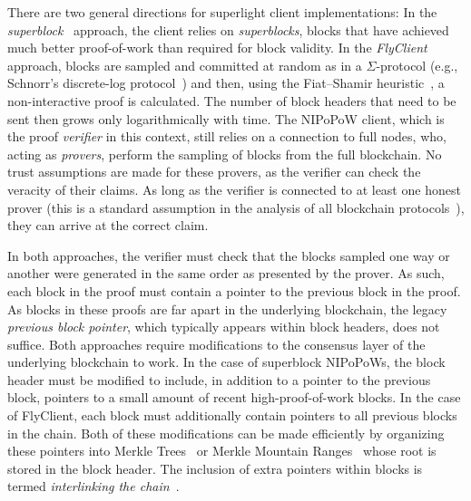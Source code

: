 There are two general directions for superlight client implementations: In the
\emph{superblock}~\cite{nipopows,compactsuperblocks} approach, the client
relies on \emph{superblocks}, blocks that have achieved much better
proof-of-work than required for block validity. In the
\emph{FlyClient}~\cite{flyclient} approach, blocks are sampled and committed at random as in a $\Sigma$-protocol (e.g., Schnorr's discrete-log protocol~\cite{schnorr}) and then, using
the Fiat--Shamir heuristic~\cite{fiatshamir}, a non-interactive proof is calculated. The number of block headers
that need to be sent then grows only logarithmically with time. The NIPoPoW
client, which is the proof \emph{verifier} in this context, still relies on a connection to full nodes,
who, acting as \emph{provers},  perform the sampling of blocks from the full
blockchain.
No trust assumptions are made for these provers, as the
verifier can check the veracity of their claims. As long as the verifier is
connected to at least one honest prover
(this is a standard assumption in the
analysis of all blockchain
protocols~\cite{eclipse,ethereum-eclipse,backbone,backbone-new,varbackbone}),
they can arrive at the correct claim.

In both approaches, the verifier must check that the blocks
sampled one way or another were generated in the same order as presented by the prover. As such, each block in the proof must contain a
pointer to the previous block in the proof. As blocks in these proofs are far
apart in the underlying blockchain, the legacy \emph{previous block pointer},
which typically appears within block headers, does not suffice.
Both approaches require modifications to the consensus layer of the underlying
blockchain to work. In the case of superblock NIPoPoWs, the block header must be
modified to include, in addition to a pointer to the previous block, pointers to
a small amount of recent high-proof-of-work blocks. In the case of FlyClient,
each block must additionally contain pointers to all previous blocks in the
chain. Both of these modifications can be made efficiently by organizing these
pointers into Merkle Trees~\cite{merkle} or Merkle Mountain Ranges~\cite{ct,mmr}
whose root is stored in the block header. The inclusion of extra pointers within
blocks is termed \emph{interlinking the chain}~\cite{popow}.

